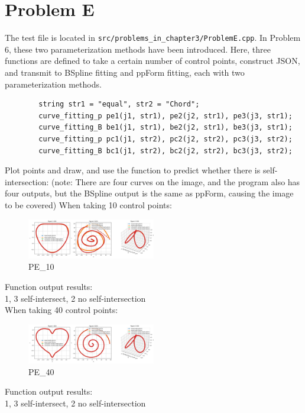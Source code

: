 \documentclass[a4paper]{article}
\begin{document}
\section*{Problem E}
    The test file is located in \texttt{src/problems\_in\_chapter3/ProblemE.cpp}.
    In Problem 6, these two parameterization methods have been introduced.
    Here, three functions are defined to take a certain number of control points, construct JSON, and transmit to BSpline fitting and ppForm fitting, each with two parameterization methods.
    \begin{verbatim}
        string str1 = "equal", str2 = "Chord";
        curve_fitting_p pe1(j1, str1), pe2(j2, str1), pe3(j3, str1);
        curve_fitting_B be1(j1, str1), be2(j2, str1), be3(j3, str1);
        curve_fitting_p pc1(j1, str2), pc2(j2, str2), pc3(j3, str2);
        curve_fitting_B bc1(j1, str2), bc2(j2, str2), bc3(j3, str2);
    \end{verbatim}
    Plot points and draw, and use the function to predict whether there is self-intersection:
    (note: There are four curves on the image, and the program also has four outputs, but the BSpline output is the same as ppForm, causing the image to be covered)
    When taking 10 control points:
    \begin{figure}[H] 
        \centering
        \includegraphics[width=0.5\textwidth]{../figure/PE_10.png} 
        \caption{PE\_10} 
    \end{figure}
    Function output results:\\
    1, 3 self-intersect, 2 no self-intersection\\
    When taking 40 control points:
    \begin{figure}[H] 
        \centering
        \includegraphics[width=0.5\textwidth]{../figure/PE_40.png} 
        \caption{PE\_40} 
    \end{figure}
    Function output results:\\
    1, 3 self-intersect, 2 no self-intersection\\
\end{document}
